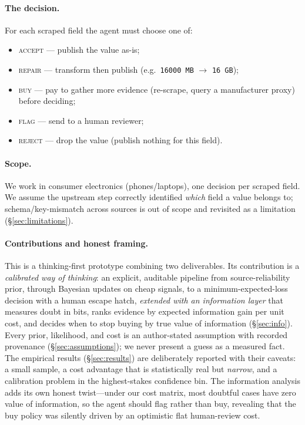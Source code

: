 \documentclass[11pt]{article}
\begin{document}
\paragraph{The decision.} For each scraped field the agent must choose one of:
\begin{itemize}[nosep]
  \item \textsc{accept} --- publish the value as-is;
  \item \textsc{repair} --- transform then publish (e.g.\ \texttt{16000\,MB}
        $\rightarrow$ \texttt{16\,GB});
  \item \textsc{buy} --- pay to gather more evidence (re-scrape, query a manufacturer
        proxy) before deciding;
  \item \textsc{flag} --- send to a human reviewer;
  \item \textsc{reject} --- drop the value (publish nothing for this field).
\end{itemize}

\paragraph{Scope.} We work in consumer electronics (phones/laptops), one decision per
scraped field. We assume the upstream step correctly identified \emph{which} field a
value belongs to; schema/key-mismatch across sources is out of scope and revisited as
a limitation (\S\ref{sec:limitations}).

\paragraph{Contributions and honest framing.} This is a thinking-first prototype
combining two deliverables. Its contribution is a \emph{calibrated way of thinking}:
an explicit, auditable pipeline from source-reliability prior, through Bayesian
updates on cheap signals, to a minimum-expected-loss decision with a human escape
hatch, \emph{extended with an information layer} that measures doubt in bits, ranks
evidence by expected information gain per unit cost, and decides when to stop buying
by true value of information (\S\ref{sec:info}). Every prior, likelihood, and cost is
an author-stated assumption with recorded provenance (\S\ref{sec:assumptions}); we
never present a guess as a measured fact. The empirical results (\S\ref{sec:results})
are deliberately reported with their caveats: a small sample, a cost advantage that is
statistically real but \emph{narrow}, and a calibration problem in the highest-stakes
confidence bin. The information analysis adds its own honest twist---under our cost
matrix, most doubtful cases have zero value of information, so the agent should flag
rather than buy, revealing that the buy policy was silently driven by an optimistic
flat human-review cost.
\end{document}
